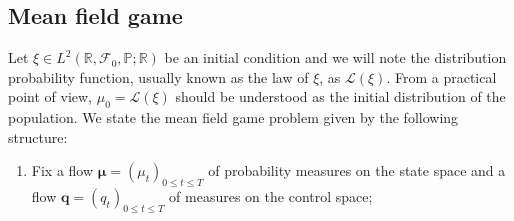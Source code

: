 \documentclass[11pt]{article}
\theoremstyle{definition}
\begin{document}

\subsection*{Mean field game}
Let $\xi\in L^2(\mathbb{R},\mathcal{F}_0,\mathbb{P};\mathbb{R})$ be an initial condition and we will note the distribution probability function, usually known as the law of $\xi$, as $\mathcal{L}(\xi)$. From a practical point of view, $\mu_0=\mathcal{L}(\xi)$ should be understood as the initial distribution of the population. We state the mean field game problem given by the following structure:
\begin{enumerate}
    \item Fix a flow $\bm{\mu}=(\mu_t)_{0\leq t\leq T}$ of probability measures on the state space and a flow $\bm{q}=(q_t)_{0\leq t\leq T}$ of measures on the control space;


\end{enumerate}
\end{document}
